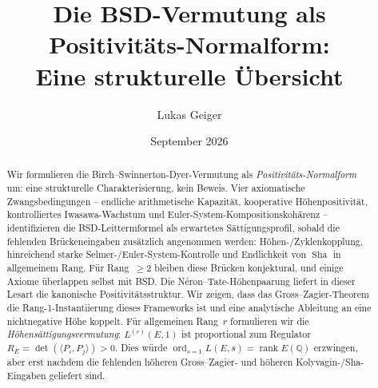 \documentclass[aps,prd,twocolumn,superscriptaddress,nofootinbib,floatfix]{revtex4-2}
\theoremstyle{definition}
\theoremstyle{remark}
\DeclareMathOperator{\ord}{ord}
\DeclareMathOperator{\rank}{rank}
\DeclareMathOperator{\Sha}{Sha}
\begin{document}

\title{\texorpdfstring{Die BSD-Vermutung als Positivitäts-Normalform:\\Eine strukturelle Übersicht}{Die BSD-Vermutung als Positivitäts-Normalform: Eine strukturelle Übersicht}}

\author{Lukas Geiger}

\date{September 2026}

\begin{abstract}
Wir formulieren die Birch--Swinnerton-Dyer-Vermutung als \textit{Positivitäts-Normalform} um: eine strukturelle Charakterisierung, kein Beweis. Vier axiomatische Zwangsbedingungen -- endliche arithmetische Kapazität, kooperative Höhenpositivität, kontrolliertes Iwasawa-Wachstum und Euler-System-Kompositionskohärenz -- identifizieren die BSD-Leittermformel als erwartetes \glqq Sättigungsprofil\grqq{}, sobald die fehlenden Brückeneingaben zusätzlich angenommen werden: Höhen-/Zyklenkopplung, hinreichend starke Selmer-/Euler-System-Kontrolle und Endlichkeit von $\Sha$ in allgemeinem Rang. Für Rang~$\geq 2$ bleiben diese Brücken konjektural, und einige Axiome überlappen selbst mit BSD. Die Néron--Tate-Höhenpaarung liefert in dieser Lesart die kanonische Positivitätsstruktur. Wir zeigen, dass das Gross--Zagier-Theorem die Rang-1-Instantiierung dieses Frameworks ist und eine analytische Ableitung an eine nichtnegative Höhe koppelt. Für allgemeinen Rang~$r$ formulieren wir die \textit{Höhensättigungsvermutung}: $L^{(r)}(E,1)$ ist proportional zum Regulator $R_E = \det(\langle P_i, P_j \rangle) > 0$. Dies würde $\ord_{s=1} L(E,s) = \rank E(\mathbb{Q})$ erzwingen, aber erst nachdem die fehlenden höheren Gross--Zagier- und höheren Kolyvagin-/Sha-Eingaben geliefert sind.
\end{abstract}


\maketitle
\onecolumngrid
\clearpage
\begingroup
\footnotesize
\linespread{0.92}\selectfont
\setlength{\parskip}{0pt}
\tableofcontents
\endgroup
\clearpage
\twocolumngrid
\end{document}
